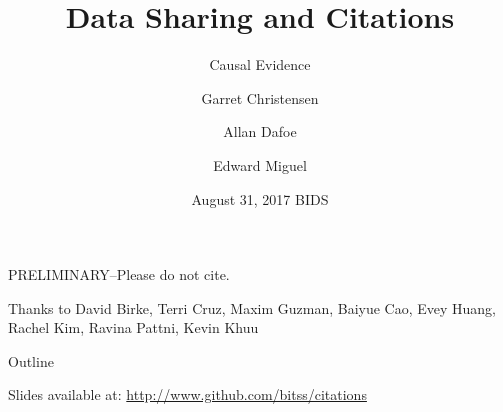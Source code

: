 \documentclass{beamer}
\title[Data Sharing and Citations] %
{Data Sharing and Citations}
\subtitle
{Causal Evidence} %
\author[Christensen, Dafoe, Miguel] %
{Garret Christensen\inst{1} \and Allan Dafoe\inst{2} \and Edward Miguel\inst{3}}
\institute[Universities of Somewhere and Elsewhere] %
{
  \inst{1}%
  Berkeley Institute for Data Science, UC Berkeley
  \and
  \inst{2}%
  Department of Political Science, Yale University
  \and
  \inst{3}%
  Department of Economics, UC Berkeley}
\date[Short Occasion] %
{August 31, 2017 BIDS}
\begin{document}
{ %
    \begin{frame}[plain]
     \end{frame}
}

\begin{frame}
  \titlepage
  \begin{center}
  \begin{large}
  PRELIMINARY--Please do not cite.
  \end{large}
  \end{center}
\end{frame}

\begin{frame}
Thanks to David Birke, Terri Cruz, Maxim Guzman, Baiyue Cao, Evey Huang, Rachel Kim, Ravina Pattni, Kevin Khuu
\end{frame}

\begin{frame}{Outline}
  \tableofcontents
  \begin{center}
  Slides available at: \url{http://www.github.com/bitss/citations}
  \begin{large}
  \end{large}
  \end{center}
\end{frame}
\end{document}
